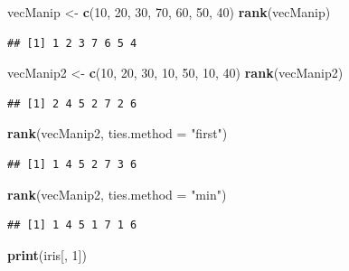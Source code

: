 \documentclass[]{book}
\newenvironment{Shaded}{\begin{snugshade}}{\end{snugshade}}
\newcommand{\KeywordTok}[1]{\textcolor[rgb]{0.13,0.29,0.53}{\textbf{#1}}}
\newcommand{\DataTypeTok}[1]{\textcolor[rgb]{0.13,0.29,0.53}{#1}}
\newcommand{\DecValTok}[1]{\textcolor[rgb]{0.00,0.00,0.81}{#1}}
\newcommand{\StringTok}[1]{\textcolor[rgb]{0.31,0.60,0.02}{#1}}
\newcommand{\NormalTok}[1]{#1}
\begin{document}
\begin{Shaded}
\begin{Highlighting}[]
\NormalTok{vecManip <-}\StringTok{ }\KeywordTok{c}\NormalTok{(}\DecValTok{10}\NormalTok{, }\DecValTok{20}\NormalTok{, }\DecValTok{30}\NormalTok{, }\DecValTok{70}\NormalTok{, }\DecValTok{60}\NormalTok{, }\DecValTok{50}\NormalTok{, }\DecValTok{40}\NormalTok{)}
\KeywordTok{rank}\NormalTok{(vecManip)}
\end{Highlighting}
\end{Shaded}

\begin{verbatim}
## [1] 1 2 3 7 6 5 4
\end{verbatim}

\begin{Shaded}
\begin{Highlighting}[]
\NormalTok{vecManip2 <-}\StringTok{ }\KeywordTok{c}\NormalTok{(}\DecValTok{10}\NormalTok{, }\DecValTok{20}\NormalTok{, }\DecValTok{30}\NormalTok{, }\DecValTok{10}\NormalTok{, }\DecValTok{50}\NormalTok{, }\DecValTok{10}\NormalTok{, }\DecValTok{40}\NormalTok{)}
\KeywordTok{rank}\NormalTok{(vecManip2)}
\end{Highlighting}
\end{Shaded}

\begin{verbatim}
## [1] 2 4 5 2 7 2 6
\end{verbatim}

\begin{Shaded}
\begin{Highlighting}[]
\KeywordTok{rank}\NormalTok{(vecManip2, }\DataTypeTok{ties.method =} \StringTok{"first"}\NormalTok{)}
\end{Highlighting}
\end{Shaded}

\begin{verbatim}
## [1] 1 4 5 2 7 3 6
\end{verbatim}

\begin{Shaded}
\begin{Highlighting}[]
\KeywordTok{rank}\NormalTok{(vecManip2, }\DataTypeTok{ties.method =} \StringTok{"min"}\NormalTok{)}
\end{Highlighting}
\end{Shaded}

\begin{verbatim}
## [1] 1 4 5 1 7 1 6
\end{verbatim}

\begin{Shaded}
\begin{Highlighting}[]
\KeywordTok{print}\NormalTok{(iris[, }\DecValTok{1}\NormalTok{])}
\end{Highlighting}
\end{Shaded}
\end{document}
